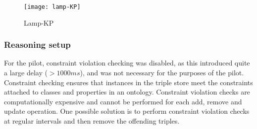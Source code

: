 \begin{figure}[bth]
\centering
\texttt{[image: lamp-KP]}
\caption{Lamp-KP}
\label{lamp-KP}
\end{figure}

% 
% 

\subsubsection{Reasoning setup}

For the pilot, constraint violation checking was disabled, as this introduced quite a large delay ($>1000ms$), and was not necessary for the purposes of the pilot. Constraint checking ensures that instances in the triple store meet the constraints attached to classes and properties in an ontology. Constraint violation checks are computationally expensive and cannot be performed for each add, remove and update operation. One possible solution is to perform constraint violation checks at regular intervals and then remove the offending triples.


